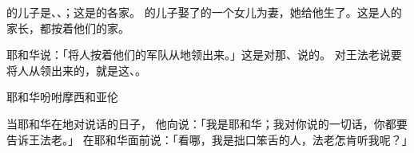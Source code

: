 {的儿子是{}、{}、{}；这是{}的各家。
的儿子{}娶了{}的一个女儿为妻，她给他生了{}。这是{}人的家长，都按着他们的家。
\par }{\PP {}耶和华说：「将{}人按着他们的军队从{}地领出来。」这是对那{}、{}说的。
对{}王法老说要将{}人从{}领出来的，就是这{}、{}。
\par }{\SH 耶和华吩咐摩西和亚伦
\par }{\PP {}当耶和华在{}地对{}说话的日子，
他向{}说：「我是耶和华；我对你说的一切话，你都要告诉{}王法老。」
在耶和华面前说：「看哪，我是拙口笨舌的人，法老怎肯听我呢？」

}
